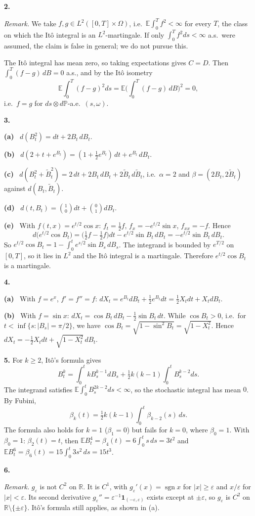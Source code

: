 \documentclass[11pt,a4paper]{article}
\newcommand{\E}{\mathbb{E}}
\renewcommand{\P}{\mathbb{P}}
\newcommand{\R}{\mathbb{R}}
\newcommand{\1}{\mathbf{1}}
\newcommand{\sgn}{\operatorname{sgn}}
\newcommand{\prob}[1]{\par\medskip\noindent\textbf{#1}\quad}
\newcommand{\sub}[1]{\par\smallskip\noindent\textbf{#1}\ }
\newcommand{\note}[1]{\par\noindent\emph{Remark.} #1}
\begin{document}
\prob{2.}
\note{We take $f,g\in L^2([0,T]\times\Omega)$, i.e.\ $\E\int_0^Tf^2<\infty$ for every $T$, the class on which the Itô integral is
an $L^2$-martingale. If only $\int_0^Tf^2ds<\infty$ a.s.\ were assumed, the claim is false in
general; we do not pursue this.}

The Itô integral has mean zero, so taking expectations gives $C=D$. Then $\int_0^T(f-g)\,dB=0$ a.s., and by the Itô
isometry
\[\E\int_0^T(f-g)^2ds=\E\Big(\int_0^T(f-g)\,dB\Big)^2=0,\]
i.e.\ $f=g$ for $ds\otimes d\P$-a.e.\ $(s,\omega)$.

\prob{3.}
\sub{(a)} $d(B_t^2)=dt+2B_t\,dB_t$.

\sub{(b)} $d(2+t+e^{B_t})=(1+\tfrac12e^{B_t})\,dt+e^{B_t}\,dB_t$.

\sub{(c)} $d(B_t^2+\tilde B_t^2)=2\,dt+2B_t\,dB_t+2\tilde B_t\,d\tilde B_t$, i.e.\ $\alpha=2$ and $\beta=(2B_t,2\tilde B_t)$ against
$d(B_t,\tilde B_t)$.

\sub{(d)} $d(t,B_t)=\binom10dt+\binom01dB_t$.

\sub{(e)} With $f(t,x)=e^{t/2}\cos x$: $f_t=\frac12f$, $f_x=-e^{t/2}\sin x$, $f_{xx}=-f$. Hence
\[
d\big(e^{t/2}\cos B_t\big)=\big(\tfrac12f-\tfrac12f\big)dt-e^{t/2}\sin B_t\,dB_t=-e^{t/2}\sin B_t\,dB_t .
\]
So $e^{t/2}\cos B_t=1-\int_0^te^{s/2}\sin B_s\,dB_s$. The integrand is bounded by $e^{T/2}$ on $[0,T]$, so it lies in $L^2$ and
the Itô integral is a martingale. Therefore $e^{t/2}\cos B_t$ is a martingale.

\prob{4.}
\sub{(a)} With $f=e^x$, $f'=f''=f$: $dX_t=e^{B_t}dB_t+\frac12e^{B_t}dt=\frac12X_tdt+X_tdB_t$.

\sub{(b)} With $f=\sin x$: $dX_t=\cos B_t\,dB_t-\frac12\sin B_t\,dt$. While $\cos B_t>0$, i.e.\ for
$t<\inf\{s:|B_s|=\pi/2\}$, we have $\cos B_t=\sqrt{1-\sin^2B_t}=\sqrt{1-X_t^2}$. Hence
$dX_t=-\frac12X_tdt+\sqrt{1-X_t^2}\,dB_t$.

\prob{5.}
For $k\ge2$, Itô's formula gives
\[B_t^k=\int_0^tkB_s^{k-1}dB_s+\tfrac12k(k-1)\int_0^tB_s^{k-2}ds.\]
The integrand satisfies $\E\int_0^tB_s^{2k-2}ds<\infty$, so the stochastic integral has mean $0$. By Fubini,
\[\beta_k(t)=\tfrac12k(k-1)\int_0^t\beta_{k-2}(s)\,ds.\]
The formula also holds for $k=1$ ($\beta_1=0$) but fails for $k=0$, where $\beta_0=1$. With $\beta_0=1$:
$\beta_2(t)=t$, then $\E B_t^4=\beta_4(t)=6\int_0^ts\,ds=3t^2$ and $\E B_t^6=\beta_6(t)=15\int_0^t3s^2\,ds=15t^3$.

\prob{6.}
\note{$g_\varepsilon$ is not $C^2$ on $\R$. It is $C^1$, with
$g_\varepsilon'(x)=\sgn x$ for $|x|\ge\varepsilon$ and $x/\varepsilon$ for $|x|<\varepsilon$. Its second derivative
$g_\varepsilon''=\varepsilon^{-1}\1_{(-\varepsilon,\varepsilon)}$ exists except at $\pm\varepsilon$, so $g_\varepsilon$ is
$C^2$ on $\R\setminus\{\pm\varepsilon\}$. Itô's formula still applies, as shown in (a).}
\end{document}
